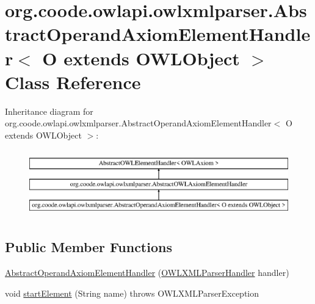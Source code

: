 \hypertarget{classorg_1_1coode_1_1owlapi_1_1owlxmlparser_1_1_abstract_operand_axiom_element_handler_3_01_o_01extends_01_o_w_l_object_01_4}{\section{org.\-coode.\-owlapi.\-owlxmlparser.\-Abstract\-Operand\-Axiom\-Element\-Handler$<$ O extends O\-W\-L\-Object $>$ Class Reference}
\label{classorg_1_1coode_1_1owlapi_1_1owlxmlparser_1_1_abstract_operand_axiom_element_handler_3_01_o_01extends_01_o_w_l_object_01_4}
}
Inheritance diagram for org.\-coode.\-owlapi.\-owlxmlparser.\-Abstract\-Operand\-Axiom\-Element\-Handler$<$ O extends O\-W\-L\-Object $>$\-:\begin{figure}[H]
\begin{center}
\leavevmode
\includegraphics[height=2.937063cm]{classorg_1_1coode_1_1owlapi_1_1owlxmlparser_1_1_abstract_operand_axiom_element_handler_3_01_o_01extends_01_o_w_l_object_01_4}
\end{center}
\end{figure}
\subsection*{Public Member Functions}
\begin{DoxyCompactItemize}
\item 
\hyperlink{classorg_1_1coode_1_1owlapi_1_1owlxmlparser_1_1_abstract_operand_axiom_element_handler_3_01_o_01extends_01_o_w_l_object_01_4_aba98e79be6fd2b51f6da8d0c3bb9c7f9}{Abstract\-Operand\-Axiom\-Element\-Handler} (\hyperlink{classorg_1_1coode_1_1owlapi_1_1owlxmlparser_1_1_o_w_l_x_m_l_parser_handler}{O\-W\-L\-X\-M\-L\-Parser\-Handler} handler)
\item 
void \hyperlink{classorg_1_1coode_1_1owlapi_1_1owlxmlparser_1_1_abstract_operand_axiom_element_handler_3_01_o_01extends_01_o_w_l_object_01_4_aebd9bf1e033169f158c7e44c0ead179f}{start\-Element} (String name)  throws O\-W\-L\-X\-M\-L\-Parser\-Exception 
\end{DoxyCompactItemize}
